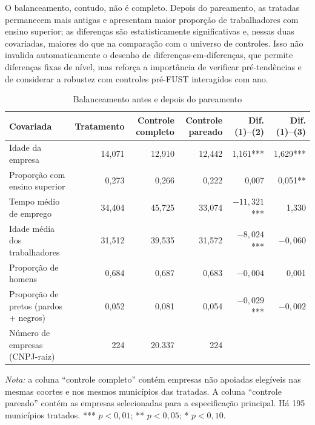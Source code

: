\documentclass[12pt,a4paper]{article}
\begin{document}
O balanceamento, contudo, não é completo. Depois do pareamento, as tratadas permanecem mais
antigas e apresentam maior proporção de trabalhadores com ensino superior; as diferenças são
estatisticamente significativas e, nessas duas covariadas, maiores do que na comparação com o
universo de controles. Isso não invalida automaticamente o desenho de diferenças-em-diferenças,
que permite diferenças fixas de nível, mas reforça a importância de verificar pré-tendências e
de considerar a robustez com controles pré-FUST interagidos com ano.

\begin{landscape}
\begin{table}[H]
\centering
\caption{Balanceamento antes e depois do pareamento}
\label{tab:balance}
\small
\setlength{\tabcolsep}{6pt}
\begin{tabular}{lrrrrr}
\toprule
Covariada & Tratamento & Controle completo & Controle pareado & Dif. (1)--(2) & Dif. (1)--(3) \\
\midrule
Idade da empresa & 14,071 & 12,910 & 12,442 & 1,161*** & 1,629*** \\
Proporção com ensino superior & 0,273 & 0,266 & 0,222 & 0,007 & 0,051** \\
Tempo médio de emprego & 34,404 & 45,725 & 33,074 & $-11,321$*** & 1,330 \\
Idade média dos trabalhadores & 31,512 & 39,535 & 31,572 & $-8,024$*** & $-0,060$ \\
Proporção de homens & 0,684 & 0,687 & 0,683 & $-0,004$ & 0,001 \\
Proporção de pretos (pardos + negros) & 0,052 & 0,081 & 0,054 & $-0,029$*** & $-0,002$ \\
\midrule
Número de empresas (CNPJ-raiz) & 224 & 20.337 & 224 & & \\
\bottomrule
\end{tabular}
\vspace{0.5em}

\begin{minipage}{0.92\linewidth}
\footnotesize{}\textit{Nota:} a coluna ``controle completo'' contém empresas não
apoiadas elegíveis nas mesmas coortes e nos mesmos municípios das tratadas. A coluna ``controle
pareado'' contém as empresas selecionadas para a especificação principal. Há 195 municípios
tratados. *** $p<0{,}01$; ** $p<0{,}05$; * $p<0{,}10$.
\end{minipage}
\end{table}
\end{landscape}
\end{document}
